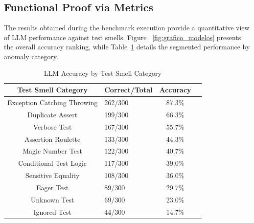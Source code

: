 \documentclass[sigconf]{acmart}
\begin{document}
\subsection{Functional Proof via Metrics}
\label{subsec:metricas}

The results obtained during the benchmark execution provide a quantitative view of LLM performance against test smells. Figure ~\ref{fig:grafico_modelos} presents the overall accuracy ranking, while Table~\ref{tab:test_type_results} details the segmented performance by anomaly category.

\begin{table}[htb]
    \centering
    \caption{LLM Accuracy by Test Smell Category}
    \label{tab:test_type_results}
    \footnotesize
    \begin{tabular}{clcc}
        \toprule
        \textbf{Test Smell Category} & \textbf{Correct/Total} & \textbf{Accuracy} \\
        \midrule
        Exception Catching Throwing & 262/300 & 87.3\% \\
        Duplicate Assert            & 199/300 & 66.3\% \\
        Verbose Test                & 167/300 & 55.7\% \\
        Assertion Roulette          & 133/300 & 44.3\% \\
        Magic Number Test           & 122/300 & 40.7\% \\
        Conditional Test Logic      & 117/300 & 39.0\% \\
        Sensitive Equality          & 108/300 & 36.0\% \\
        Eager Test                  & 89/300  & 29.7\% \\
        Unknown Test                & 69/300  & 23.0\% \\
        Ignored Test                & 44/300  & 14.7\% \\
        \bottomrule
    \end{tabular}
\end{table}
\end{document}
